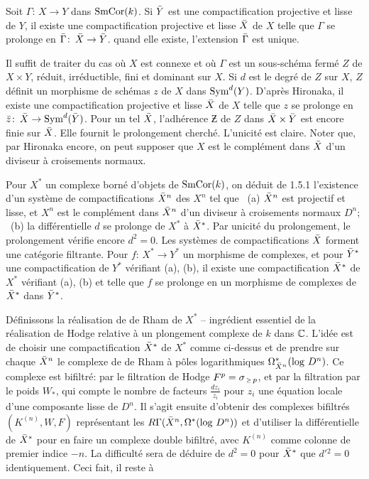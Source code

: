 Soit $\Gamma\colon\, X\to Y$ dans $\text{\rm SmCor}(k)$.
Si $\bar{Y}$ est une compactification projective
et lisse de $Y$, il existe une
compactification projective et lisse $\bar{X}$
de $X$ telle que $\Gamma$ se prolonge en
$\bar{\Gamma}\colon\,\bar{X}\to\bar{Y}$.
quand elle existe, l'extension $\bar{\Gamma}$ 
est unique.
\endproclaim

Il suffit de traiter du cas o\`u $X$ est
connexe et o\`u $\Gamma$ est un sous-sch\'ema
ferm\'e $Z$ de $X\times Y$, r\'eduit,
irr\'eductible, fini et dominant sur $X$.
Si $d$ est le degr\'e de $Z$ sur $X$, $Z$ d\'efinit
un morphisme de sch\'emas $z$ de $X$ dans
$\text{\rm Sym}^d(Y)$.
D'apr\`es Hironaka, il existe une
compactification projective et lisse $\bar{X}$
de $X$ telle que $z$ se prolonge en
$\bar{z}\colon\, \bar{X}\to\text{\rm Sym}^d(\bar{Y})$.
Pour un tel $\bar{X}$, l'adh\'erence $\Zbar$ de
$Z$ dans $\bar{X}\times\bar{Y}$ est encore finie
sur $\bar{X}$.
Elle fournit le prolongement cherch\'e.
L'unicit\'e est claire.
Noter que, par Hironaka encore, on peut
supposer que $X$ est le compl\'ement dans
$\bar{X}$ d'un diviseur \`a croisements normaux.

Pour $X^*$ un complexe born\'e d'objets de
$\text{\rm SmCor}(k)$, on d\'eduit de 1.5.1 l'existence
d'un syst\`eme de compactifications $\bar{X}^n$
des $X^n$ tel que \ (a) $\bar{X}^n$ est
projectif et lisse, et $X^n$ est le
compl\'ement dans $\bar{X}^n$ d'un diviseur \`a
croisements normaux $D^n$; \ (b) la
diff\'erentielle $d$ se prolonge de $X^*$ \`a
$\bar{X}^*$.
Par unicit\'e du prolongement, le prolongement
v\'erifie encore $d^2=0$.
Les syst\`emes de compactifications $\bar{X}$
forment une cat\'egorie filtrante.
Pour $f\colon\, X^*\to Y^*$ un morphisme de
complexes, et pour $\bar{Y}^*$ une
compactification de $Y^*$ v\'erifiant (a),
(b), il existe une compactification $\bar{X}^*$
de $X^*$ v\'erifiant (a), (b) et telle que $f$
se prolonge en un morphisme de complexes de
$\bar{X}^*$ dans $\bar{Y}^*$.
\enddemo

D\'efinissons la r\'ealisation de de Rham de
$X^*$ -- ingr\'edient essentiel de la
r\'ealisation de Hodge relative \`a un
plongement complexe de $k$ dans ${\Bbb C}$.
L'id\'ee est de choisir une compactification
$\bar{X}^*$ de $X^*$ comme ci-dessus et de
prendre sur chaque $\bar{X}^n$ le complexe de de
Rham \`a p\^{o}les logarithmiques
$\Omega_{\bar{X}^n}^*(\log\,D^n)$.
Ce complexe est bifiltr\'e: par le filtration
de Hodge $F^p=\sigma_{\Ge p}$, et par la
filtration par le poids $W_*$, qui compte le
nombre de facteurs $\frac{dz_i}{z_i}$ pour
$z_i$ une \'equation locale d'une composante
lisse de $D^n$.
Il s'agit ensuite d'obtenir des complexes
bifiltr\'es $(K^{(n)},W,F)$ repr\'esentant les
$R\Gamma(\bar{X}^n,\Omega^*(\log\,D^n))$ et
d'utiliser la diff\'erentielle de $\bar{X}^*$
pour en faire un complexe double bifiltr\'e,
avec $K^{(n)}$ comme colonne de premier indice
$-n$.
La difficult\'e sera de d\'eduire de $d^2=0$
pour $\bar{X}^*$ que $d'{^2}=0$ identiquement.
Ceci fait, il reste \`a

